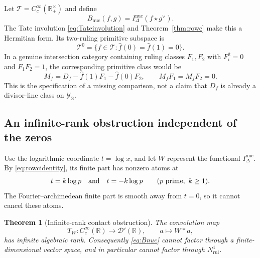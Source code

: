 \documentclass[11pt]{amsart}
\newtheorem{theorem}{Theorem}[section]
\theoremstyle{definition}
\theoremstyle{remark}
\begin{document}
Let $\mathcal T=C_c^\infty(\mathbb R_+^\times)$ and define
\begin{equation}\label{eq:Bnuc}
 B_{\mathrm{nuc}}(f,g)=I_\Delta^{\mathrm{nuc}}(f\star g^\vee).
\end{equation}
The Tate involution \eqref{eq:Tateinvolution} and
Theorem~\ref{thm:rowc} make this a Hermitian form.  Its two-ruling primitive
subspace is
\begin{equation}\label{eq:twoprimitive}
 \mathcal T^0=\{f\in\mathcal T:
                  \widehat f(0)=\widehat f(1)=0\}.
\end{equation}
In a genuine intersection category containing ruling classes $F_1,F_2$ with
$F_i^2=0$ and $F_1F_2=1$, the corresponding primitive class would be
\begin{equation}\label{eq:requiredprimitiveclass}
 M_f=D_f-\widehat f(1)F_1-\widehat f(0)F_2,
 \qquad M_fF_1=M_fF_2=0.
\end{equation}
This is the specification of a missing comparison, not a claim that $D_f$
is already a divisor-line class on $\mathscr Y_{\mathbb S}$.

\subsection{An infinite-rank obstruction independent of the zeros}

Use the logarithmic coordinate $t=\log x$, and let $W$ represent the
functional $I_\Delta^{\mathrm{nuc}}$.  By \eqref{eq:rowcidentity}, its finite
part has nonzero atoms at
\begin{equation}\label{eq:primeatoms}
 t=k\log p\quad\hbox{and}\quad t=-k\log p
 \qquad(p\text{ prime},\ k\ge1).
\end{equation}
The Fourier--archimedean finite part is smooth away from $t=0$, so it cannot
cancel these atoms.

\begin{theorem}[Infinite-rank contact obstruction]
\label{thm:infiniterankcontact}
The convolution map
\[
 T_W:C_c^\infty(\mathbb R)\longrightarrow\mathcal D'(\mathbb R),
 \qquad a\longmapsto W*a,
\]
has infinite algebraic rank.  Consequently \eqref{eq:Bnuc} cannot factor
through a finite-dimensional vector space, and in particular cannot factor
through $N^1_{\mathrm{rul}}$.
\end{theorem}
\end{document}
